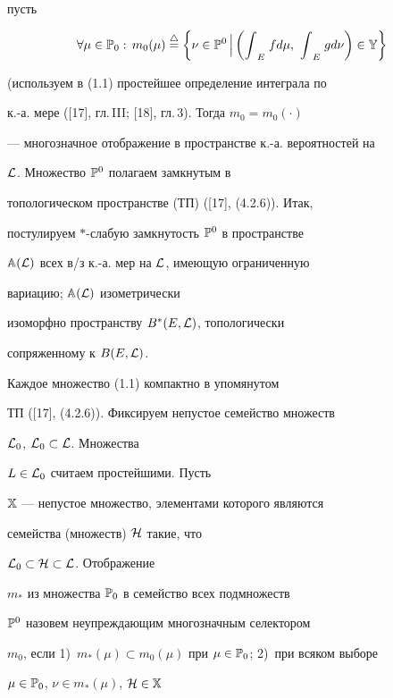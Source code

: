 пусть 


\begin{equation}


\forall{\mu} \in {{\Bbb P}_0}:\,


{m_0}(\mu)\stac \bigg\{\nu \in {{\Bbb P}^0} \,\Big|


\,\bigg({{\int}_E}\;f{d\mu},\ {{\int}_E}\;g{d\nu}\bigg) \in {\Bbb Y}\bigg\}


\end{equation}


(используем в (1.1) простейшее определение интеграла по


к.-а. мере ([17], гл.\,III; [18], гл.\,3). Тогда ${m_0} = {{m_0}(\cdot)}$


--- многозначное отображение в пространстве к.-а. вероятностей на


${\cal L}$. Множество ${\Bbb P}^0$ полагаем замкнутым в


топологическом пространстве (ТП) ([17], (4.2.6)). Итак,


постулируем $*$-слабую замкнутость ${\Bbb P}^0$ в пространстве


${\Bbb A}({\cal L})$ всех в/з к.-а. мер на ${\cal L}$, имеющую ограниченную


вариацию; ${\Bbb A}({\cal L})$ изометрически


изоморфно пространству ${B^*}(E,{\cal L})$, топологически


сопряженному к $B(E,{\cal L})$.


Каждое множество (1.1) компактно в упомянутом


ТП ([17], (4.2.6)). Фиксируем непустое семейство множеств


${{\cal L}_0}$, ${{\cal L}_0} \subset {\cal L}$. Множества


$L \in {{\cal L}_0}$ считаем простейшими. Пусть


${\Bbb X}$ --- непустое множество, элементами которого являются


семейства (множеств) ${\cal H}$ такие, что


${{\cal L}_0} \subset {\cal H} \subset {\cal L}$. Отображение


$m_*$ из множества ${\Bbb P}_0$ в семейство всех подмножеств


${\Bbb P}^0$ назовем неупреждающим многозначным селектором


$m_0$, если 1)~${m_*}(\mu) \subset


{m_0}(\mu)$ при $\mu \in {{\Bbb P}_0}$; 2)~при всяком выборе


$\mu \in {{\Bbb P}_0}$, $\nu \in {m_*}(\mu)$, ${\cal H} \in {\Bbb X}$


